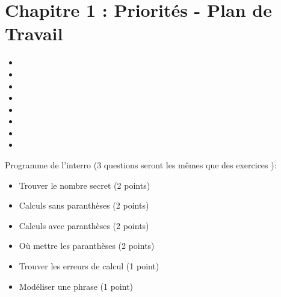 \section*{Chapitre 1 : Priorités - Plan de Travail}

{\begin{multicols}{4}
\begin{itemize}
    \itemindent=-25pt
        \item {}
        \item {}
        \item {}
        \item {}
        \item {}
        \item {}
        \item {}
        \item {}
    \end{itemize}
\end{multicols}}

\begin{plandetravailDS}
    Programme de l'interro (3 questions seront les mêmes que des exercices ):
    \begin{itemize}
        \item Trouver le nombre secret (2 points)
        \item Calculs sans paranthèses (2 points)
        \item Calculs avec paranthèses (2 points)
        \item Où mettre les paranthèses (2 points)
        \item Trouver les erreurs de calcul (1 point)
        \item Modéliser une phrase (1 point)
    \end{itemize}
\end{plandetravailDS}


